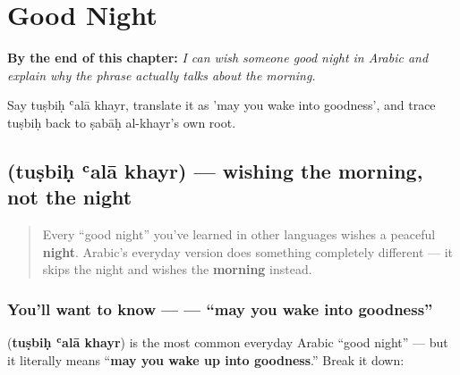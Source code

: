 
\chapter{Good Night}
\label{ch:ar-good-night}

\begin{chapteropening}
\textbf{By the end of this chapter:} \emph{I can wish someone good night in Arabic and explain why the phrase actually talks about the morning.}

Say tuṣbiḥ ʿalā khayr, translate it as 'may you wake into goodness', and trace tuṣbiḥ back to ṣabāḥ al-khayr's own root.
\end{chapteropening}

\section[\texorpdfstring{\ar{تصبح} \ar{على} \ar{خير} (tuṣbiḥ ʿalā khayr)}{تصبح على خير (tuṣbiḥ ʿalā khayr)}]{   (tuṣbiḥ ʿalā khayr) — wishing the morning, not the night}

\label{lesson:AR-C27-tusbih-ala-khayr}



\begin{quote}
Every \textquotedblleft{}good night\textquotedblright{} you've learned in other languages wishes a peaceful \textbf{night}. Arabic's everyday version does something completely different — it skips the night and wishes the \textbf{morning} instead.
\end{quote}

\subsection*{You'll want to know —    — \textquotedblleft{}may you wake into goodness\textquotedblright{}}
\textbf{  } (\textbf{tuṣbiḥ ʿalā khayr}) is the most common everyday Arabic \textquotedblleft{}good night\textquotedblright{} — but it literally means \textquotedblleft{}\textbf{may you wake up into goodness}.\textquotedblright{} Break it down:

